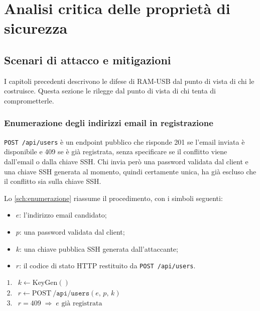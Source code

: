 \chapter{Analisi critica delle proprietà di sicurezza}
\label{chap:sicurezza}

\section{Scenari di attacco e mitigazioni}
\label{sec:scenari-attacco}

I capitoli precedenti descrivono le difese di RAM-USB dal punto di vista di chi le costruisce. 
Questa sezione le rilegge dal punto di vista di chi tenta di comprometterle. 

\subsection{Enumerazione degli indirizzi email in registrazione}

\texttt{POST /api/users} è un endpoint pubblico che risponde 201 se l'email inviata è disponibile
e 409 se è già registrata, senza specificare se il conflitto viene dall'email o dalla 
chiave SSH. Chi invia però una password validata dal client e una chiave SSH generata al momento, 
quindi certamente unica, ha già escluso che il conflitto sia sulla chiave SSH. 

Lo \autoref{sch:enumerazione} riassume il procedimento, con i simboli seguenti:

\begin{itemize}
    \item $e$: l'indirizzo email candidato;
    \item $p$: una password validata dal client;
    \item $k$: una chiave pubblica SSH generata dall'attaccante;
    \item $r$: il codice di stato HTTP restituito da \texttt{POST /api/users}.
\end{itemize}

\begin{schema}
\centering
$\begin{array}{rl}
1. & k \leftarrow \mathrm{KeyGen}() \\[4pt]
2. & r \leftarrow \mathrm{POST}\ \texttt{/api/users}(e, \, p, \, k) \\[4pt]
3. & r = 409 \;\Longrightarrow\; e \mbox{ già registrata}
\end{array}$
\caption{Verifica se un indirizzo email è già registrato.}
\label{sch:enumerazione}
\end{schema}

